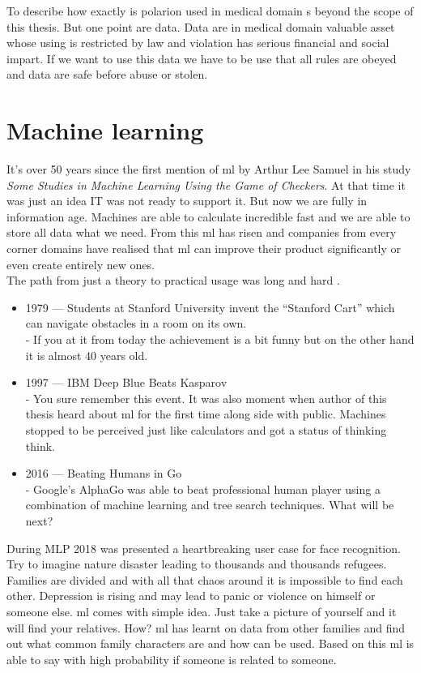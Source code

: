 \documentclass[thesis=M,english]{FITthesis}[2012/06/26]
\begin{document}
To describe how exactly is \acrshort{polarion} used in medical domain s beyond the scope of this thesis. But one point are data. Data are in medical domain valuable asset whose using is restricted by law and violation has serious financial and social impart. If we want to use this data we have to be use that all rules are obeyed and data are safe before abuse or stolen.

\chapter{Machine learning}

It's over 50 years since the first mention of \acrshort{ml} by Arthur Lee Samuel in his study \textit{Some Studies in Machine Learning Using the Game of Checkers}\cite{ml_first_occurence}. At that time it was just an idea IT was not ready to support it. But now we are fully in information age. Machines are able to calculate incredible fast and we are able to store all data what we need. From this \acrshort{ml} has risen and companies from every corner domains have realised that \acrshort{ml} can improve their product significantly or even create entirely new ones.\\

The path from just a theory to practical usage was long and hard \cite{ml_history}.\\

\begin{itemize}[nosep]
	\item 1979 — Students at Stanford University invent the “Stanford Cart” which can navigate obstacles in a room on its own.\\
	- If you at it from today the achievement is a bit funny but on the other hand it is almost 40 years old.
	\item 1997 — IBM Deep Blue Beats Kasparov\\
	- You sure remember this event. It was also  moment when author of this thesis heard about \acrshort{ml} for the first time along side with public. Machines stopped to be perceived just like calculators and got a status of thinking think.
	\item 2016 — Beating Humans in Go\\
	 - Google's AlphaGo was able to beat professional human player using a combination of machine learning and tree search techniques. What will be next? 
\end{itemize}

\pagebreak
During MLP 2018 \cite{mlp2018_microsoft} was presented a heartbreaking user case for face recognition. Try to imagine nature disaster leading to thousands and thousands refugees. Families are divided and with all that chaos around it is impossible to find each other. Depression is rising and may lead to panic or violence on himself or someone else. \acrshort{ml} comes with simple idea. Just take a picture of yourself and it will find your relatives. How? \acrshort{ml} has learnt on data from other families and find out what common family characters are and how can be used. Based on this \acrshort{ml} is able to say with high probability if someone is related to someone. \\
\end{document}

